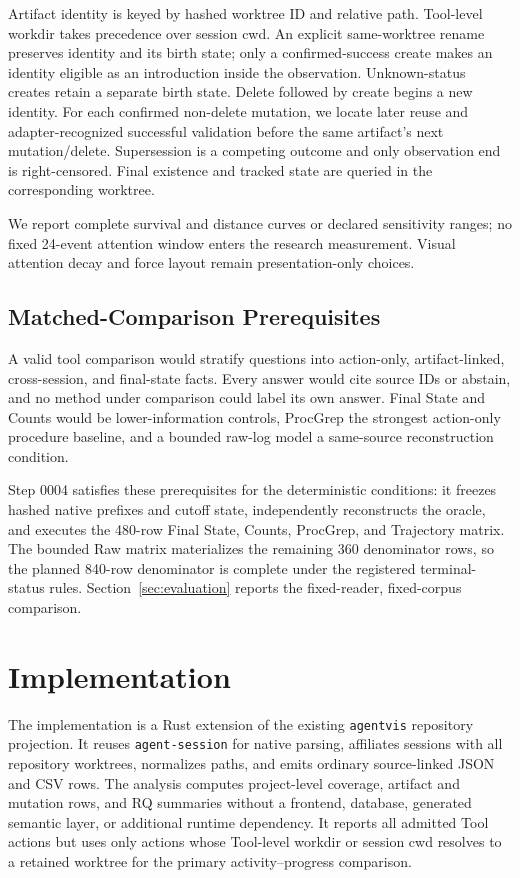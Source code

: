 \documentclass[letterpaper]{article}
\newcommand{\artifact}[1]{\texttt{#1}}
\begin{document}
Artifact identity is keyed by hashed worktree ID and relative path. Tool-level
workdir takes precedence over session cwd. An explicit same-worktree rename
preserves identity and its birth state; only a confirmed-success create makes
an identity eligible as an introduction inside the observation. Unknown-status
creates retain a separate birth state. Delete followed by create begins a new identity. For each
confirmed non-delete mutation, we locate later reuse and adapter-recognized
successful validation before the same artifact's next mutation/delete.
Supersession is a competing outcome and only observation end is right-censored.
Final existence and tracked state are queried in the corresponding worktree.

We report complete survival and distance curves or declared sensitivity ranges;
no fixed 24-event attention window enters the research measurement.  Visual
attention decay and force layout remain presentation-only choices.

\subsection{Matched-Comparison Prerequisites}

A valid tool comparison would stratify questions into action-only,
artifact-linked, cross-session, and final-state facts.  Every answer would cite
source IDs or abstain, and no method under comparison could label its own
answer.  Final State and Counts would be lower-information controls, ProcGrep
the strongest action-only procedure baseline, and a bounded raw-log model a
same-source reconstruction condition.

Step 0004 satisfies these prerequisites for the deterministic conditions: it
freezes hashed native prefixes and cutoff state, independently reconstructs
the oracle, and executes the 480-row Final State, Counts, ProcGrep, and
Trajectory matrix.  The bounded Raw matrix materializes the remaining 360
denominator rows, so the planned 840-row denominator is complete under the
registered terminal-status rules.  Section~\ref{sec:evaluation} reports the
fixed-reader, fixed-corpus comparison.

\section{Implementation}
\label{sec:implementation}

The implementation is a Rust extension of the existing \artifact{agentvis}
repository projection.  It reuses \artifact{agent-session} for native parsing,
affiliates sessions with all repository worktrees, normalizes paths, and emits
ordinary source-linked JSON and CSV rows.  The analysis computes project-level
coverage, artifact and mutation rows, and RQ summaries without a frontend,
database, generated semantic layer, or additional runtime dependency.
It reports all admitted Tool actions but uses only actions whose Tool-level
workdir or session cwd resolves to a retained worktree for the primary
activity--progress comparison.
\end{document}
